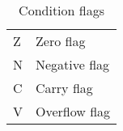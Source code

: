 
\begin{table}[ht]
	\centering
	\begin{tabular}{|l l|}
		\hline
		Z & Zero flag \\
		N & Negative flag \\
		C & Carry flag \\
		V & Overflow flag \\
		\hline
	\end{tabular}
	\caption{Condition flags}
	\label{tab:condition_flags}
\end{table}
